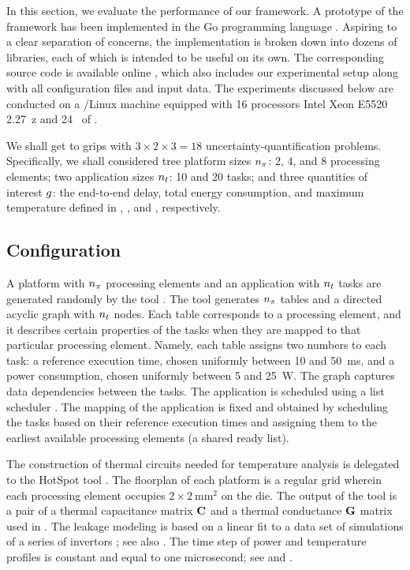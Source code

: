 In this section, we evaluate the performance of our framework. A prototype of
the framework has been implemented in the Go programming language \cite{go}.
Aspiring to a clear separation of concerns, the implementation is broken down
into dozens of libraries, each of which is intended to be useful on its own. The
corresponding source code is available online \cite{sources}, which also
includes our experimental setup along with all configuration files and input
data. The experiments discussed below are conducted on a /Linux machine
equipped with 16 processors Intel Xeon E5520 2.27~z and 24~ of
.

We shall get to grips with $3 \times 2 \times 3 = 18$ uncertainty-quantification
problems. Specifically, we shall considered tree platform sizes ${n_\pi}$: 2, 4, and
8 processing elements; two application sizes ${n_t}$: 10 and 20 tasks; and three
quantities of interest $g$: the end-to-end delay, total energy consumption, and
maximum temperature defined in , , and
, respectively.

\subsection{Configuration}

A platform with ${n_\pi}$ processing elements and an application with ${n_t}$ tasks
are generated randomly by the  tool \cite{dick1998}. The tool generates
${n_\pi}$ tables and a directed acyclic graph with ${n_t}$ nodes. Each table
corresponds to a processing element, and it describes certain properties of the
tasks when they are mapped to that particular processing element. Namely, each
table assigns two numbers to each task: a reference execution time, chosen
uniformly between 10 and 50~ms, and a power consumption, chosen uniformly
between 5 and 25~W. The graph captures data dependencies between the tasks. The
application is scheduled using a list scheduler \cite{adam1974}. The mapping of
the application is fixed and obtained by scheduling the tasks based on their
reference execution times and assigning them to the earliest available
processing elements (a shared ready list).

The construction of thermal  circuits needed for temperature analysis is
delegated to the HotSpot tool \cite{skadron2004}. The floorplan of each platform
is a regular grid wherein each processing element occupies $2 \times
2~\text{mm}^2$ on the die. The output of the tool is a pair of a thermal
capacitance matrix $\mathbf{C}$ and a thermal conductance $\mathbf{G}$ matrix used in
. The leakage modeling is based on a linear fit to a data
set of  simulations of a series of  invertors
\cite{ukhov2012, liu2007}; see also \cite{ukhov2014}. The time step of power and
temperature profiles is constant and equal to one microsecond; see 
and .

